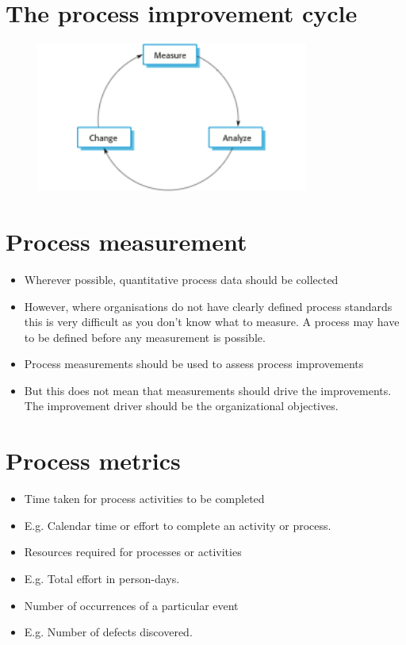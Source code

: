 \section{The process improvement cycle}
\begin{figure}[h!]
    \centering
    \includegraphics[width = 0.8\textwidth]{./figures/L9_2.png}
    \caption{}
    \label{fig:L9_2}
\end{figure}

\section{Process measurement}
\begin{itemize}

\item Wherever possible, quantitative process data should be collected

   \item However, where organisations do not have clearly defined process standards this is very difficult as you don’t know what to measure. A process may have to be defined before any measurement is possible.

\item Process measurements should be used to assess process improvements

   \item But this does not mean that measurements should drive the improvements. The improvement driver should be the organizational objectives.


\end{itemize}

\section{Process metrics}
\begin{itemize}




\item Time taken for process activities to be completed

   \item E.g. Calendar time or effort to complete an activity or process. \item Resources required for processes or activities
   \item E.g. Total effort in person-days.

\item Number of occurrences of a particular event    \item E.g. Number of defects discovered.

\end{itemize}

